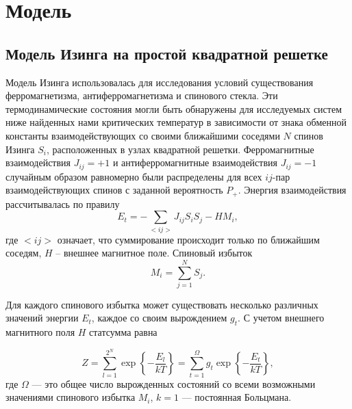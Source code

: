 \chapter{Модель}\label{ch:ch1}

\section{Модель Изинга на простой квадратной решетке}
Модель Изинга использовалась для исследования условий существования ферромагнетизма, антиферромагнетизма и спинового стекла. Эти термодинамические состояния могли быть обнаружены для исследуемых систем ниже найденных нами критических температур в зависимости от знака обменной константы взаимодействующих со своими ближайшими соседями $N$ спинов Изинга $S_i$, расположенных в узлах квадратной решетки. Ферромагнитные взаимодействия $J_{ij}=+1$ и антиферромагнитные взаимодействия $J_{ij}=-1$ случайным образом равномерно были распределены для всех $ij$-пар взаимодействующих спинов с заданной вероятность $P_+$. Энергия взаимодействия рассчитывалась по правилу
\begin{equation}
	E_t = -\sum_{<ij>}J_{ij} S_iS_j-HM_i,
	\label{eq:internal_energy}
\end{equation}
где $<ij>$ означает, что суммирование происходит только по ближайшим соседям, $H$ -- внешнее магнитное поле.  Спиновый избыток
\begin{equation}
	M_i = \sum_{j=1}^NS_j.
	\label{eq:spinex}
\end{equation}

Для каждого спинового избытка может существовать несколько различных значений энергии $E_t$, каждое со своим вырождением $g_t$. С учетом внешнего магнитного поля $H$ статсумма равна

\begin{equation}  
	Z=\sum_{l=1}^{2^N}\exp\left\{-\frac{E_l}{kT}\right\}=\sum_{t=1}^{\Omega}g_t \exp\left\{-\frac{E_t}{kT}\right\},
	\label{eq:partfunk}
\end{equation}
где $\Omega$ --- это общее число вырожденных состояний со всеми возможными значениями спинового избытка $M_i$, $k=1$ --- постоянная Больцмана. 